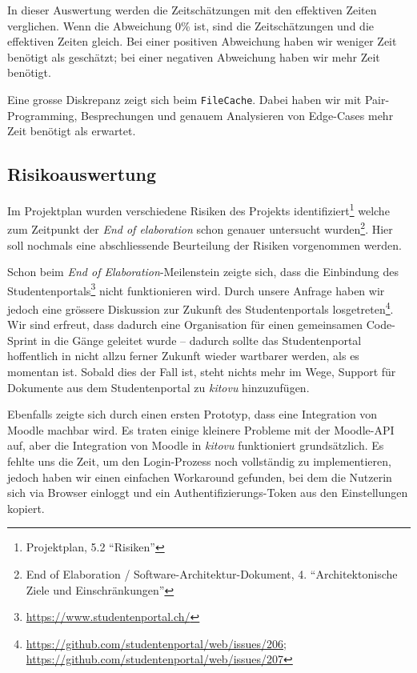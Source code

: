 \documentclass[a4paper]{article}
\begin{document}
In dieser Auswertung werden die Zeitschätzungen mit den effektiven Zeiten verglichen.
Wenn die Abweichung 0\% ist, sind die Zeitschätzungen und die effektiven Zeiten gleich.
Bei einer positiven Abweichung haben wir weniger Zeit benötigt als geschätzt;
bei einer negativen Abweichung haben wir mehr Zeit benötigt.

Eine grosse Diskrepanz zeigt sich beim \verb|FileCache|.
Dabei haben wir mit Pair-Programming, Besprechungen und genauem Analysieren von Edge-Cases mehr Zeit benötigt als erwartet.

\subsection{Risikoauswertung}

Im Projektplan wurden verschiedene Risiken des Projekts
identifiziert\footnote{Projektplan, 5.2 ``Risiken''} welche zum Zeitpunkt der
\emph{End of elaboration} schon genauer untersucht wurden\footnote{End of
Elaboration / Software-Architektur-Dokument, 4. ``Architektonische Ziele und
Einschränkungen''}. Hier soll nochmals eine abschliessende Beurteilung der
Risiken vorgenommen werden.

Schon beim \emph{End of Elaboration}-Meilenstein zeigte sich, dass die
Einbindung des Studentenportals\footnote{\url{https://www.studentenportal.ch/}}
nicht funktionieren wird. Durch unsere Anfrage haben wir jedoch eine grössere
Diskussion zur Zukunft des Studentenportals
losgetreten\footnote{\url{https://github.com/studentenportal/web/issues/206}; \\
\url{https://github.com/studentenportal/web/issues/207}}. Wir sind erfreut, dass
dadurch eine Organisation für einen gemeinsamen Code-Sprint in die Gänge
geleitet wurde -- dadurch sollte das Studentenportal hoffentlich in nicht allzu
ferner Zukunft wieder wartbarer werden, als es momentan ist. Sobald dies der
Fall ist, steht nichts mehr im Wege, Support für Dokumente aus dem
Studentenportal zu \emph{kitovu} hinzuzufügen.

Ebenfalls zeigte sich durch einen ersten Prototyp, dass eine Integration von
Moodle machbar wird. Es traten einige kleinere Probleme mit der Moodle-API auf,
aber die Integration von Moodle in \emph{kitovu} funktioniert grundsätzlich. Es
fehlte uns die Zeit, um den Login-Prozess noch vollständig zu implementieren,
jedoch haben wir einen einfachen Workaround gefunden, bei dem die Nutzerin sich
via Browser einloggt und ein Authentifizierungs-Token aus den Einstellungen kopiert.
\end{document}
